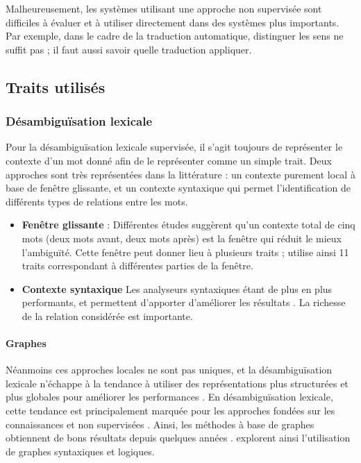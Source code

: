 Malheureusement, les systèmes utilisant une approche non supervisée sont
difficiles à évaluer et à utiliser directement dans des systèmes plus
importants. Par exemple, dans le cadre de la traduction automatique, distinguer
les sens ne suffit pas ; il faut aussi savoir quelle traduction appliquer.

\subsection{Traits utilisés}

\subsubsection{Désambiguïsation lexicale}

Pour la désambiguïsation lexicale supervisée, il s'agit toujours de représenter
le contexte d'un mot donné afin de le représenter comme un simple trait. Deux
approches sont très représentées dans la littérature : un contexte purement
local à base de fenêtre glissante, et un contexte syntaxique qui permet
l'identification de différents types de relations entre les mots.

\begin{itemize}

    \item \textbf{Fenêtre glissante} : Différentes études
        \citep{kaplan1955experimental,choueka1985disambiguation,karlgren2001from,kohomban2005learning,dinu2007sometimes}
        suggèrent qu'un contexte total de cinq mots (deux mots avant, deux mots
        après) est la fenêtre qui réduit le mieux l'ambiguïté. Cette fenêtre
        peut donner lieu à plusieurs traits ; \cite{chan2007nus} utilise ainsi
        11 traits correspondant à différentes parties de la fenêtre.

    \item \textbf{Contexte syntaxique} Les analyseurs syntaxiques étant de plus
        en plus performants, et permettent d'apporter d'améliorer les résultats
        \citep{martinez2002syntactic}. La richesse de la relation considérée
        est importante.

\end{itemize}

\paragraph{Graphes}

Néanmoins ces approches locales ne sont pas uniques, et la désambiguïsation
lexicale n'échappe à la tendance à utiliser des représentations plus
structurées et plus globales pour améliorer les performances
\citep{marquez2012special}. En désambiguïsation lexicale, cette tendance est
principalement marquée pour les approches fondées sur les connaissances et non
supervisées \citep[p~.14]{navigli2009word}. Ainsi, les méthodes à base de
graphes \cite{navigli2005semantic,agirre2009personalizing} obtiennent de bons
résultats depuis quelques années
\citep{navigli2007semeval,ponzetto2010knowledge}. %
explorent ainsi l'utilisation de graphes syntaxiques et logiques.

